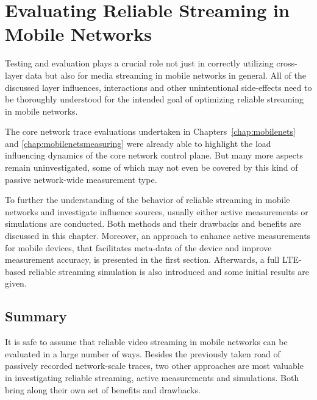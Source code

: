 \chapter{Evaluating Reliable Streaming in Mobile Networks}
\label{chap:mobilestreaming-measurements}

Testing and evaluation plays a crucial role not just in correctly utilizing cross-layer data but also for media streaming in mobile networks in general. All of the discussed layer influences, interactions and other unintentional side-effects need to be thoroughly understood for the intended goal of optimizing reliable streaming in mobile networks.

The core network trace evaluations undertaken in Chapters~\ref{chap:mobilenets} and \ref{chap:mobilenetsmeasuring} were already able to highlight the load influencing dynamics of the core network control plane. But many more aspects remain uninvestigated, some of which may not even be covered by this kind of passive network-wide measurement type.

To further the understanding of the behavior of reliable streaming in mobile networks and investigate influence sources, usually either active measurements or simulations are conducted. Both methods and their drawbacks and benefits are discussed in this chapter. Moreover, an approach to enhance active measurements for mobile devices, that facilitates meta-data of the device and improve measurement accuracy, is presented in the first section. Afterwards, a full \gls{LTE}-based reliable streaming simulation is also introduced and some initial results are given.







\section{Summary}

It is safe to assume that reliable video streaming in mobile networks can be evaluated in a large number of ways. Besides the previously taken road of passively recorded network-scale traces, two other approaches are most valuable in investigating reliable streaming, active measurements and simulations. Both bring along their own set of benefits and drawbacks. 

